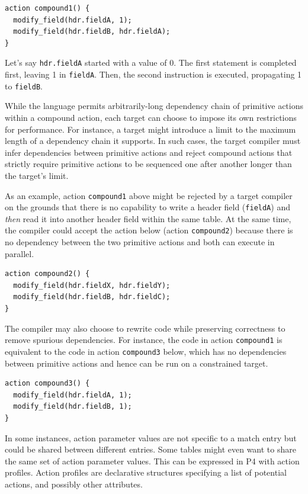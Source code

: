 \documentclass[12pt]{article}
\begin{document}
\begin{lstlisting}[style=P4style]
action compound1() {
  modify_field(hdr.fieldA, 1);
  modify_field(hdr.fieldB, hdr.fieldA);
}
\end{lstlisting}

Let's say \texttt{hdr.fieldA} started with a value of 0. The first statement is
completed first, leaving 1 in \texttt{fieldA}. Then, the second instruction is
executed, propagating 1 to \texttt{fieldB}.

While the language permits arbitrarily-long dependency chain of primitive actions
within a compound action, each target can choose to impose its own restrictions
for performance. For instance, a target might introduce a limit to the maximum 
length of a dependency chain it supports. In such cases, the target
compiler must infer dependencies between primitive actions and reject
compound actions that strictly require primitive actions to be sequenced one after
another longer than the target's limit.

As an example, action \texttt{compound1} above might be 
rejected by a target compiler on the grounds that there is no capability to write 
a header field (\texttt{fieldA}) and \textit{then} read it into another header field
within the same table. At the same time, the compiler could accept the action below 
(action \texttt{compound2}) because there is no dependency between the two primitive 
actions and both can execute in parallel.

\begin{lstlisting}[style=P4style]
action compound2() {
  modify_field(hdr.fieldX, hdr.fieldY);
  modify_field(hdr.fieldB, hdr.fieldC);
}
\end{lstlisting}

The compiler may also choose to rewrite code while preserving correctness to
remove spurious dependencies. For instance, the code in action \texttt{compound1} 
is equivalent to the code in action \texttt{compound3} below, which has no 
dependencies between primitive actions and hence can be run on a constrained target.

\begin{lstlisting}[style=P4style]
action compound3() {
  modify_field(hdr.fieldA, 1);
  modify_field(hdr.fieldB, 1);
}
\end{lstlisting}


In some instances, action parameter values are not specific to a match entry but
could be shared between different entries. Some tables might even want to share
the same set of action parameter values. This can be expressed in P4 with
action profiles.
Action profiles are declarative structures specifying a list of potential
actions, and possibly other attributes.
\end{document}
